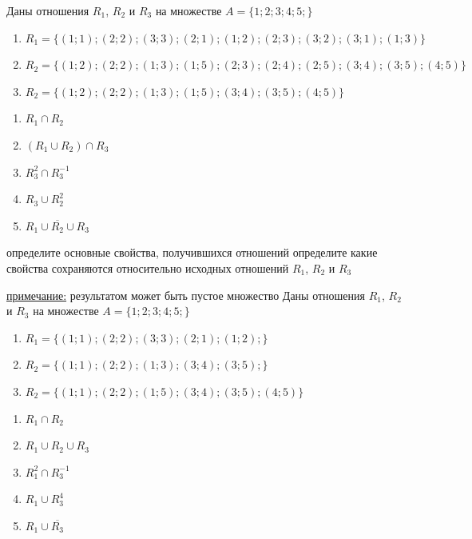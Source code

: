 \documentclass[10pt]{exam}
\begin{document}
\begin{questions}
\question
Даны отношения $R_1$, $R_2$ и $R_3$ на множестве $A = \{1; 2; 3; 4; 5;\}$ 
\begin{enumerate}
	\renewcommand{\labelenumi}{\alph{enumi})}
	\item $R_1 = \{(1; 1); (2; 2); (3; 3); (2; 1); (1; 2); (2; 3); (3; 2); (3; 1); (1; 3)\}$
	\item $R_2 = \{(1; 2); (2; 2); (1; 3); (1; 5); (2; 3); (2; 4); (2; 5); (3; 4); (3; 5); (4; 5)\}$
	\item $R_2 = \{(1; 2); (2; 2); (1; 3); (1; 5); (3; 4); (3; 5); (4; 5)\}$
\end{enumerate}

\begin{enumerate}
	\renewcommand{\labelenumi}{\alph{enumi})}
	\item $R_1 \cap R_2$
	\item $(R_1 \cup R_2) \cap R_3$
	\item $R_3^2 \cap R_3^{-1}$
	\item $R_3 \cup R_2^2$
	\item $R_1 \cup \overline{R_2} \cup R_3$
\end{enumerate}

определите основные свойства, получившихся отношений
определите какие свойства сохраняются относительно исходных отношений $R_1$, $R_2$ и $R_3$ 

\underline{примечание:} результатом может быть пустое множество\question
Даны отношения $R_1$, $R_2$ и $R_3$ на множестве $A = \{1; 2; 3; 4; 5;\}$ 
\begin{enumerate}
	\renewcommand{\labelenumi}{\alph{enumi})}
	\item $R_1 = \{(1; 1); (2; 2); (3; 3); (2; 1); (1; 2); \}$
	\item $R_2 = \{(1; 1); (2; 2); (1; 3); (3; 4); (3; 5);\}$
	\item $R_2 = \{(1; 1); (2; 2);  (1; 5); (3; 4); (3; 5); (4; 5)\}$
\end{enumerate}

\begin{enumerate}
	\renewcommand{\labelenumi}{\alph{enumi})}
	\item $R_1 \cap R_2$
	\item $R_1 \cup R_2 \cup R_3$
	\item $R_1^2 \cap R_3^{-1}$
	\item $R_1 \cup R_3^4$
	\item $R_1 \cup \overline{R_3}$
\end{enumerate}


\end{questions}
\end{document}
